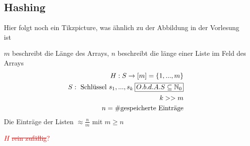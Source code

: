 \subsection{Hashing}
\begin{center}
Hier folgt noch ein Tikzpicture, was ähnlich zu der Abbildung in der Vorlesung ist
\end{center}
$m$ beschreibt die Länge des Arrays, $n$ beschreibt die länge einer Liste im Feld des Arrays
\begin{align*}
    H: S \rightarrow [m] = \{1, ..., m\}\\
    S: \text{ Schlüssel } s_1, ..., s_k \:\rectangled{$O.b.d.A. S \subseteq \N_0$}\\
    k >> m\\
    n = \# \text{gespeicherte Einträge}
\end{align*}
Die Einträge der Listen $\approx \frac{n}{m}$ mit $m \geq n$\\
\begin{center}
\end{center}

\textcolor{red}{$H$ \grqq \sout{rein zufällig}\glqq?}

